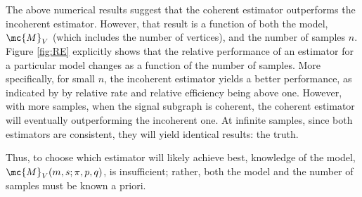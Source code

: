 \documentclass[10pt,journal,cspaper,compsoc]{IEEEtran}
\begin{document}
The above numerical results suggest that the coherent estimator outperforms the incoherent estimator.  However, that result is a function of both the model, $\mc{M}_V$ (which includes the number of vertices), and the number of samples $n$.  %
Figure \ref{fig:RE} explicitly shows that the relative performance of an estimator for a particular model changes as a function of the number of samples.  More specifically, for small $n$, the incoherent estimator yields a better performance, as indicated by by relative rate and relative efficiency being above one.  However, with more samples, when the signal subgraph is coherent, the coherent estimator will eventually outperforming the incoherent one.  At infinite samples, since both estimators are consistent, they will yield identical results: the truth.  

Thus, to choose which estimator will likely achieve best, knowledge of the model, $\mc{M}_V(m,s;\pi,p,q)$, is insufficient; rather, both the model and the number of samples must be known a priori.  
\end{document}
